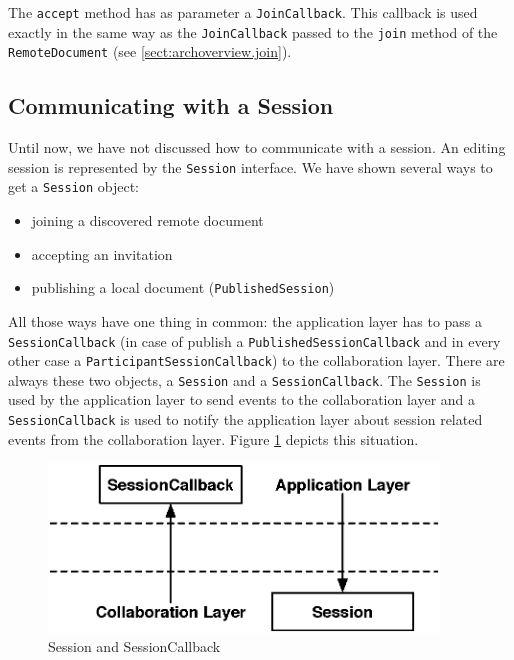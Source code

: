 The \texttt{accept} method has as parameter a \texttt{Join\-Callback}. This
callback is used exactly in the same way as the \texttt{Join\-Callback} passed
to the \texttt{join} method of the \texttt{Remote\-Document} 
(see \ref{sect:archoverview.join}).


\subsection{Communicating with a Session}
Until now, we have not discussed how to communicate with a session. An
editing session is represented by the \texttt{Session} interface.
We have shown several ways to get a \texttt{Session} object:

\begin{itemize}
 \item joining a discovered remote document
 \item accepting an invitation
 \item publishing a local document (\texttt{PublishedSession})
\end{itemize}

All those ways have one thing in common: the application layer has to pass a 
\texttt{Session\-Callback}
(in case of publish a \texttt{Published\-Session\-Callback} and in every
other case a \texttt{Participant\-Session\-Callback}) to the collaboration
layer. There are always these two objects, a \texttt{Session} and
a \texttt{Session\-Callback}. The \texttt{Session} is used by the application
layer to send events to the collaboration layer and a \texttt{Session\-Callback}
is used to notify the application layer about session related events from the 
collaboration layer. Figure \ref{fig:archoverview.sessionandcallback} depicts 
this situation.

\begin{figure}[H]
 \centering
 \includegraphics[width=10.37cm,height=4.48cm]{../images/finalreport/architecture_session_sessioncallback.eps}
 \caption{Session and SessionCallback}
 \label{fig:archoverview.sessionandcallback}
\end{figure}

